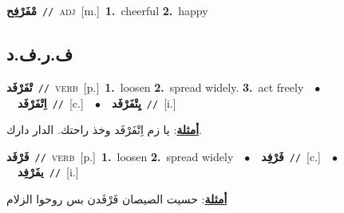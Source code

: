 \documentclass[10pt,a4paper,twoside]{article} %
\begin{document}
\begin{multicols}{2}
{\setlength\topsep{0pt}\textbf{\foreignlanguage{arabic}{مْفَرْفِح}}\ {\color{gray}\texttt{//}\color{black}}\ \textsc{adj}\ [m.]\ \textbf{1.}~cheerful  \textbf{2.}~happy\ } \vspace{2mm}

\vspace{-3mm}
\subsection*{\color{blue}\foreignlanguage{arabic}{ف.ر.ف.د}\color{blue}{}} 

{\setlength\topsep{0pt}\textbf{\foreignlanguage{arabic}{تْفَرْفَد}}\ {\color{gray}\texttt{//}\color{black}}\ \textsc{verb}\ [p.]\ \textbf{1.}~loosen  \textbf{2.}~spread widely.  \textbf{3.}~act freely\ \ $\bullet$\ \ \setlength\topsep{0pt}\textbf{\foreignlanguage{arabic}{اِتْفَرْفَد}}\ {\color{gray}\texttt{//}\color{black}}\ [c.]\ \ $\bullet$\ \ \setlength\topsep{0pt}\textbf{\foreignlanguage{arabic}{يِتْفَرْفَد}}\ {\color{gray}\texttt{//}\color{black}}\ [i.]\  \begin{flushright}\color{gray}\foreignlanguage{arabic}{\textbf{\underline{\foreignlanguage{arabic}{أمثلة}}}: يا زم اِتْفَرْفَد وخذ راحتك. الدار دارك.}\end{flushright}\color{black}} \vspace{2mm}

{\setlength\topsep{0pt}\textbf{\foreignlanguage{arabic}{فَرْفَد}}\ {\color{gray}\texttt{//}\color{black}}\ \textsc{verb}\ [p.]\ \textbf{1.}~loosen  \textbf{2.}~spread widely\ \ $\bullet$\ \ \setlength\topsep{0pt}\textbf{\foreignlanguage{arabic}{فَرْفِد}}\ {\color{gray}\texttt{//}\color{black}}\ [c.]\ \ $\bullet$\ \ \setlength\topsep{0pt}\textbf{\foreignlanguage{arabic}{يفَرْفِد}}\ {\color{gray}\texttt{//}\color{black}}\ [i.]\  \begin{flushright}\color{gray}\foreignlanguage{arabic}{\textbf{\underline{\foreignlanguage{arabic}{أمثلة}}}: حسيت الصيصان فَرْفَدن بس روحوا الزلام}\end{flushright}\color{black}} \vspace{2mm}


\end{multicols}
\end{document}
